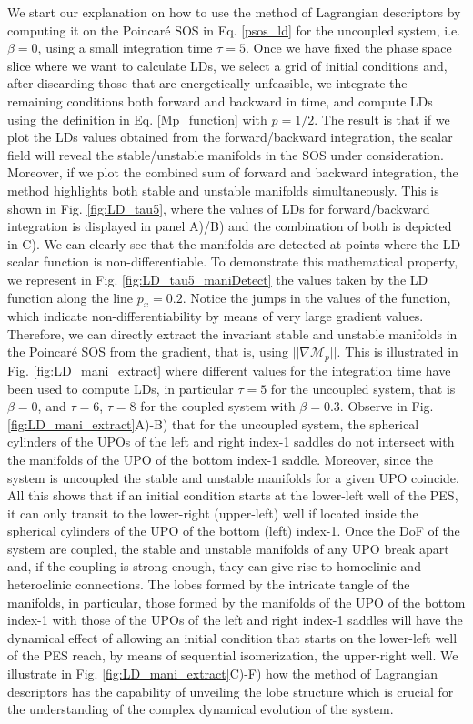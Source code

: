 \documentclass[9pt]{article}
\begin{document}
We start our explanation on how to use the method of Lagrangian descriptors by computing it on the Poincar\'e SOS in Eq. \eqref{psos_ld} for the uncoupled system, i.e. $\beta = 0$, using a small integration time $\tau = 5$. Once we have fixed the phase space slice where we want to calculate LDs, we select a grid of initial conditions and, after discarding those that are energetically unfeasible, we integrate the remaining conditions both forward and backward in time, and compute LDs using the definition in Eq. \eqref{Mp_function} with $p = 1/2$. The result is that if we plot the LDs values obtained from the forward/backward integration, the scalar field will reveal the stable/unstable manifolds in the SOS under consideration. Moreover, if we plot the combined sum of forward and backward integration, the method highlights both stable and unstable manifolds simultaneously. This is shown in Fig. \ref{fig:LD_tau5}, where the values of LDs for forward/backward integration is displayed in panel A)/B) and the combination of both is depicted in C). We can clearly see that the manifolds are detected at points where the LD scalar function is non-differentiable. To demonstrate this mathematical property, we represent in Fig. \ref{fig:LD_tau5_maniDetect} the values taken by the LD function along the line $p_x = 0.2$. Notice the jumps in the values of the function, which indicate non-differentiability by means of very large gradient values. Therefore, we can directly extract the invariant stable and unstable manifolds in the Poincar\'e SOS from the gradient, that is, using $||\nabla \mathcal{M}_p||$. This is illustrated in Fig. \ref{fig:LD_mani_extract}  where different values for the integration time have been used to compute LDs, in particular $\tau = 5$ for the uncoupled system, that is $\beta = 0$, and $\tau = 6$, $\tau = 8$ for the coupled system with $\beta = 0.3$. Observe in Fig. \ref{fig:LD_mani_extract}A)-B) that for the uncoupled system, the spherical cylinders of the UPOs of the left and right index-1 saddles do not intersect with the manifolds of the UPO of the bottom index-1 saddle. Moreover, since the system is uncoupled the stable and unstable manifolds for a given UPO coincide. All this shows that if an initial condition starts at the lower-left well of the PES, it can only transit to the lower-right  (upper-left) well if located inside the spherical cylinders of the UPO of the bottom (left) index-1. Once the DoF of the system are coupled, the stable and unstable manifolds of any UPO break apart and, if the coupling is strong enough, they can give rise to homoclinic and heteroclinic connections. The lobes formed by the intricate tangle of the manifolds, in particular, those formed by the manifolds of the UPO of the bottom index-1 with those of the UPOs of the left and right index-1 saddles will have the dynamical effect of allowing an initial condition that starts on the lower-left well of the PES reach, by means of sequential isomerization, the upper-right well. We illustrate in Fig. \ref{fig:LD_mani_extract}C)-F) how the method of Lagrangian descriptors has the capability of unveiling the lobe structure which is crucial for the understanding of the complex dynamical evolution of the system.
\end{document}
